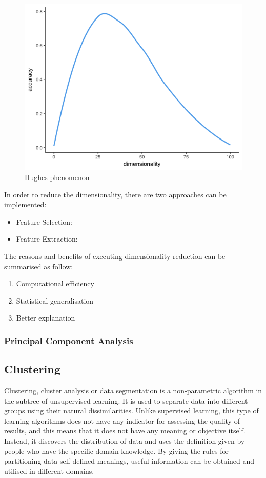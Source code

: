 \documentclass[11pt]{article} %
\theoremstyle{plain}
\theoremstyle{definition}
\begin{document}
\begin{figure}[htp]
  \includegraphics[width=0.8\linewidth, center]{resources/dimensionality.png}
  \caption{Hughes phenomenon}
  \label{fig:hughes}
\end{figure}

In order to reduce the dimensionality, there are two approaches can be implemented:
\begin{itemize}
  \item Feature Selection: 
  \item Feature Extraction:
\end{itemize}

The reasons and benefits of executing dimensionality reduction can be summarised as follow:
\begin{enumerate}
  \item Computational efficiency
  \item Statistical generalisation
  \item Better explanation
\end{enumerate}

\subsubsection{Principal Component Analysis}
\subsection{Clustering}

Clustering, cluster analysis or data segmentation is a non-parametric algorithm in the subtree of unsupervised learning. It is used to separate data into different groups using their natural dissimilarities. Unlike supervised learning, this type of learning algorithms does not have any indicator for assessing the quality of results, and this means that it does not have any meaning or objective itself. Instead, it discovers the distribution of data and uses the definition given by people who have the specific domain knowledge. By giving the rules for partitioning data self-defined meanings, useful information can be obtained and utilised in different domains\cite{hastie/etal:2009}.
\end{document}
